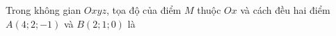 \begin{ex}
Trong không gian $Oxyz$, tọa độ của điểm $M$ thuộc $Ox$ và cách đều hai điểm $A(4;2;-1)$ và $B(2;1;0)$ là
\end{ex}
